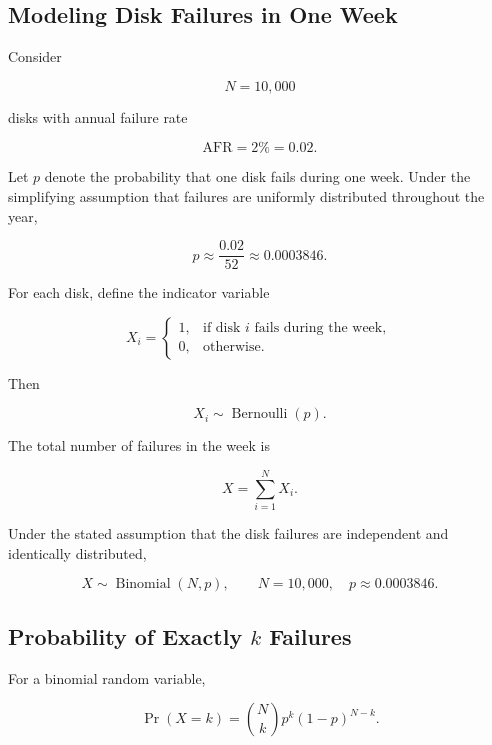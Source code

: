 \documentclass[11pt,a4paper,oneside]{book}
\begin{document}
\subsection{Modeling Disk Failures in One Week}

Consider

\[
N = 10{,}000
\]

disks with annual failure rate

\[
\mathrm{AFR}=2\%=0.02.
\]

Let \(p\) denote the probability that one disk fails during one week. Under the simplifying assumption that failures are uniformly distributed throughout the year,

\begin{equation}
p \approx \frac{0.02}{52}
  \approx 0.0003846.
\label{eq:weekly-failure-prob}
\end{equation}

For each disk, define the indicator variable

\begin{equation}
X_i =
\begin{cases}
1, & \text{if disk } i \text{ fails during the week},\\
0, & \text{otherwise}.
\end{cases}
\label{eq:indicator}
\end{equation}

Then

\[
X_i \sim \operatorname{Bernoulli}(p).
\]

The total number of failures in the week is

\begin{equation}
X = \sum_{i=1}^{N} X_i.
\label{eq:total-failures}
\end{equation}

Under the stated assumption that the disk failures are independent and identically distributed,

\begin{equation}
X \sim \operatorname{Binomial}(N,p),
\qquad
N=10{,}000,
\quad
p\approx 0.0003846.
\label{eq:binomial-model}
\end{equation}

\subsection{Probability of Exactly \texorpdfstring{$k$}{k} Failures}

For a binomial random variable,

\begin{equation}
\Pr(X=k)
=
\binom{N}{k}
p^k
(1-p)^{N-k}.
\label{eq:binomial-pmf}
\end{equation}
\end{document}
